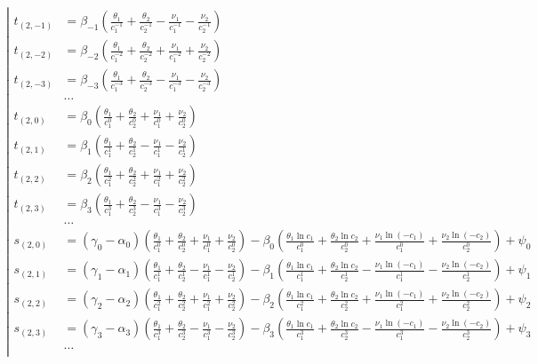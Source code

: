 \begin{equation*} \left| \begin{aligned}
t_{(2,-1)} &=
  \beta_{-1}
  \left(
  \frac{\theta_1}{c_1^{-1}}
+ \frac{\theta_2}{c_2^{-1}}
- \frac{\nu_1}{c_1^{-1}}
- \frac{\nu_2}{c_2^{-1}}
  \right) \\
%
t_{(2,-2)} &=
  \beta_{-2}
  \left(
  \frac{\theta_1}{c_1^{-2}}
+ \frac{\theta_2}{c_2^{-2}}
+ \frac{\nu_1}{c_1^{-2}}
+ \frac{\nu_2}{c_2^{-2}}
  \right) \\
%
t_{(2,-3)} &=
  \beta_{-3}
  \left(
  \frac{\theta_1}{c_1^{-3}}
+ \frac{\theta_2}{c_2^{-3}}
- \frac{\nu_1}{c_1^{-3}}
- \frac{\nu_2}{c_2^{-3}}
  \right) \\
%
&\ldots \\
%
t_{(2,0)} &=
  \beta_0
  \left(
  \frac{\theta_1}{c_1^0}
+ \frac{\theta_2}{c_2^0}
+ \frac{\nu_1}{c_1^0}
+ \frac{\nu_2}{c_2^0}
  \right) \\
%
t_{(2,1)} &=
  \beta_1
  \left(
  \frac{\theta_1}{c_1^1}
+ \frac{\theta_2}{c_2^1}
- \frac{\nu_1}{c_1^1}
- \frac{\nu_2}{c_2^1}
  \right) \\
%
t_{(2,2)} &=
  \beta_2
  \left(
  \frac{\theta_1}{c_1^2}
+ \frac{\theta_2}{c_2^2}
+ \frac{\nu_1}{c_1^2}
+ \frac{\nu_2}{c_2^2}
  \right) \\
%
t_{(2,3)} &=
  \beta_3
  \left(
  \frac{\theta_1}{c_1^3}
+ \frac{\theta_2}{c_2^3}
- \frac{\nu_1}{c_1^3}
- \frac{\nu_2}{c_2^3}
  \right) \\
%
&\ldots \\
%
s_{(2,0)} &=
  (\gamma_0 - \alpha_0)
  \left(
  \frac{\theta_1}{c_1^0}
+ \frac{\theta_2}{c_2^0}
+ \frac{\nu_1}{c_1^0}
+ \frac{\nu_2}{c_2^0}
  \right)
- \beta_0
  \left(
  \frac{\theta_1 \ln{c_1}}{c_1^0}
+ \frac{\theta_2 \ln{c_2}}{c_2^0}
+ \frac{\nu_1 \ln{(- c_1)}}{c_1^0}
+ \frac{\nu_2 \ln{(- c_2)}}{c_2^0}
  \right)
+ \psi_0 \\
%
s_{(2,1)} &=
  (\gamma_1 - \alpha_1)
  \left(
  \frac{\theta_1}{c_1^1}
+ \frac{\theta_2}{c_2^1}
- \frac{\nu_1}{c_1^1}
- \frac{\nu_2}{c_2^1}
  \right)
- \beta_1
  \left(
  \frac{\theta_1 \ln{c_1}}{c_1^1}
+ \frac{\theta_2 \ln{c_2}}{c_2^1}
- \frac{\nu_1 \ln{(- c_1)}}{c_1^1}
- \frac{\nu_2 \ln{(- c_2)}}{c_2^1}
  \right)
+ \psi_1 \\
%
s_{(2,2)} &=
  (\gamma_2 - \alpha_2)
  \left(
  \frac{\theta_1}{c_1^2}
+ \frac{\theta_2}{c_2^2}
+ \frac{\nu_1}{c_1^2}
+ \frac{\nu_2}{c_2^2}
  \right)
- \beta_2
  \left(
  \frac{\theta_1 \ln{c_1}}{c_1^2}
+ \frac{\theta_2 \ln{c_2}}{c_2^2}
+ \frac{\nu_1 \ln{(- c_1)}}{c_1^2}
+ \frac{\nu_2 \ln{(- c_2)}}{c_2^2}
  \right)
+ \psi_2 \\
%
s_{(2,3)} &=
  (\gamma_3 - \alpha_3)
  \left(
  \frac{\theta_1}{c_1^3}
+ \frac{\theta_2}{c_2^3}
- \frac{\nu_1}{c_1^3}
- \frac{\nu_2}{c_2^3}
  \right)
- \beta_3
  \left(
  \frac{\theta_1 \ln{c_1}}{c_1^3}
+ \frac{\theta_2 \ln{c_2}}{c_2^3}
- \frac{\nu_1 \ln{(- c_1)}}{c_1^3}
- \frac{\nu_2 \ln{(- c_2)}}{c_2^3}
  \right)
+ \psi_3 \\
%
&\ldots \\
\end{aligned} \right. \end{equation*}

